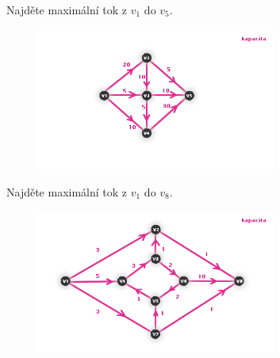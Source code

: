 \begin{t_exercise}
  \item Najděte maximální tok z $v_1$ do $v_5$.
  \begin{figure}[!htbp]
    \centering
    \includegraphics[width=0.7\textwidth]{img/net4.png}
  \end{figure}
  
  \item Najděte maximální tok z $v_1$ do $v_8$.
  \begin{figure}[!htbp]
    \centering
    \includegraphics[width=0.7\textwidth]{img/net5.png}
  \end{figure}
\end{t_exercise}